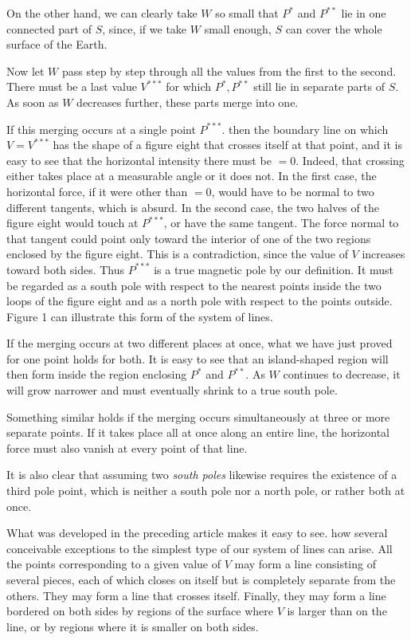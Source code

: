 On the other hand, we can clearly take $W$ so small that $P^*$ and $P^{**}$ lie in one connected part of $S$, since, if we take $W$ small enough, $S$ can cover the whole surface of the Earth.

Now let $W$ pass step by step through all the values from the first to the second. There must be a last value $V^{***}$ for which $P^*,P^{**}$ still lie in separate parts of $S$. As soon as $W$ decreases further, these parts merge into one.

If this merging occurs at a single point $P^{***}$. then the boundary line on which $V=V^{***}$ has the shape of a figure eight that crosses itself at that point, and it is easy to see that the horizontal intensity there must be $=0$. Indeed, that crossing either takes place at a measurable angle or it does not. In the first case, the horizontal force, if it were other than $=0$, would have to be normal to two different tangents, which is absurd. In the second case, the two halves of the figure eight would touch at $P^{***}$, or have the same tangent. The force normal to that tangent could point only toward the interior of one of the two regions enclosed by the figure eight. This is a contradiction, since the value of $V$ increases toward both sides. Thus $P^{***}$ is a true magnetic pole by our definition. It must be regarded as a south pole with respect to the nearest points inside the two loops of the figure eight and as a north pole with respect to the points outside. Figure 1 can illustrate this form of the system of lines.

If the merging occurs at two different places at once, what we have just proved for one point holds for both. It is easy to see that an island-shaped region will then form inside the region enclosing $P^*$ and $P^{**}$. As $W$ continues to decrease, it will grow narrower and must eventually shrink to a true south pole.

Something similar holds if the merging occurs simultaneously at three or more separate points. If it takes place all at once along an entire line, the horizontal force must also vanish at every point of that line.

It is also clear that assuming two \textit{south poles} likewise requires the existence of a third pole point, which is neither a south pole nor a north pole, or rather both at once.

What was developed in the preceding article makes it easy to see. how several conceivable exceptions to the simplest type of our system of lines can arise. All the points corresponding to a given value of $V$ may form a line consisting of several pieces, each of which closes on itself but is completely separate from the others. They may form a line that crosses itself. Finally, they may form a line bordered on both sides by regions of the surface where $V$ is larger than on the line, or by regions where it is smaller on both sides.

